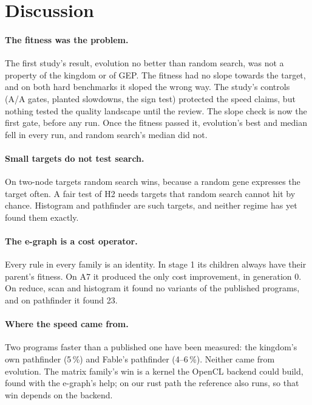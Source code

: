 \documentclass[sigconf,nonacm]{acmart}
\begin{document}
\section{Discussion}
\paragraph{The fitness was the problem.} The first study's result, evolution
no better than random search, was not a property of the kingdom or of GEP.
The fitness had no slope towards the target, and on both hard benchmarks it
sloped the wrong way. The study's controls (A/A gates, planted slowdowns, the
sign test) protected the speed claims, but nothing tested the quality landscape
until the review. The slope check is now the first gate, before any run. Once
the fitness passed it, evolution's best and median fell in every run, and
random search's median did not.

\paragraph{Small targets do not test search.} On two-node targets random search
wins, because a random gene expresses the target often. A fair test of H2 needs
targets that random search cannot hit by chance. Histogram and pathfinder are
such targets, and neither regime has yet found them exactly.

\paragraph{The e-graph is a cost operator.} Every rule in every family is an
identity. In stage 1 its children always have their parent's fitness. On A7 it
produced the only cost improvement, in generation 0. On reduce, scan and
histogram it found no variants of the published programs, and on pathfinder
it found 23.

\paragraph{Where the speed came from.} Two programs faster than a published
one have been measured: the kingdom's own pathfinder (5\,\%) and Fable's
pathfinder (4--6\,\%). Neither came from evolution. The matrix family's win is
a kernel the OpenCL backend could build, found with the e-graph's help; on our
rust path the reference also runs, so that win depends on the backend.
\end{document}
